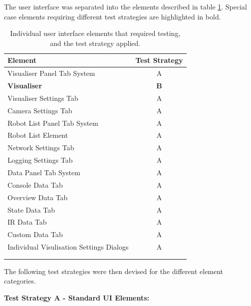 \vspace{0.5cm}

\noindent The user interface was separated into the elements described in table \ref{tab:UserInterfaceElements}. Special case elements requiring different test strategies are highlighted in bold.

\begin{longtable}{ l c }
 Element & Test Strategy\\
 \hline
 Visualiser Panel Tab System & A \\
 \textbf{Visualiser} & \textbf{B} \\
 Visualiser Settings Tab & A \\
 Camera Settings Tab & A \\
 Robot List Panel Tab System & A \\
 Robot List Element & A \\
 Network Settings Tab & A \\
 Logging Settings Tab & A \\
 Data Panel Tab System & A \\
 Console Data Tab & A \\
 Overview Data Tab & A \\
 State Data Tab & A \\
 IR Data Tab & A \\
 Custom Data Tab & A \\
 Individual Visulisation Settings Dialogs & A \\
 \bottomrule
 \caption[User Interface Elements for Testing]{Individual user interface elements that required testing, and the test strategy applied.}\\
 \label{tab:UserInterfaceElements}
\end{longtable}

\noindent The following test strategies were then devised for the different element categories.

\textbf{Test Strategy A - Standard UI Elements:}

